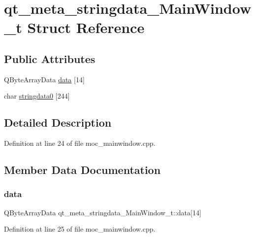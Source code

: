 \hypertarget{structqt__meta__stringdata___main_window__t}{}\section{qt\+\_\+meta\+\_\+stringdata\+\_\+\+Main\+Window\+\_\+t Struct Reference}
\label{structqt__meta__stringdata___main_window__t}
\subsection*{Public Attributes}
\begin{DoxyCompactItemize}
\item 
Q\+Byte\+Array\+Data \mbox{\hyperlink{structqt__meta__stringdata___main_window__t_ad57cc890dc3b8cf35a39343e14e30337}{data}} \mbox{[}14\mbox{]}
\item 
char \mbox{\hyperlink{structqt__meta__stringdata___main_window__t_ae7676ba302a2234a4156c1a3beec30ad}{stringdata0}} \mbox{[}244\mbox{]}
\end{DoxyCompactItemize}


\subsection{Detailed Description}


Definition at line 24 of file moc\+\_\+mainwindow.\+cpp.



\subsection{Member Data Documentation}
\mbox{\label{structqt__meta__stringdata___main_window__t_ad57cc890dc3b8cf35a39343e14e30337}} 
\subsubsection{\texorpdfstring{data}{data}}
{\footnotesize\ttfamily Q\+Byte\+Array\+Data qt\+\_\+meta\+\_\+stringdata\+\_\+\+Main\+Window\+\_\+t\+::data\mbox{[}14\mbox{]}}



Definition at line 25 of file moc\+\_\+mainwindow.\+cpp.

